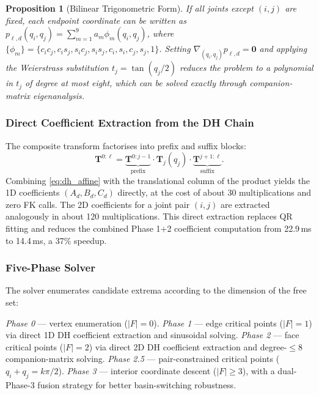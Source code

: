 \documentclass[journal]{IEEEtran}
\newtheorem{proposition}{Proposition}
\begin{document}
\begin{proposition}[Bilinear Trigonometric Form]\label{prop:bilinear}
If all joints except $(i,j)$ are fixed, each endpoint coordinate can be
written as
$p_{\ell,d}(q_i, q_j) = \sum_{m=1}^{9} a_m \phi_m(q_i, q_j)$,
where
$\{\phi_m\} = \{c_i c_j, c_i s_j, s_i c_j, s_i s_j, c_i, s_i, c_j, s_j, 1\}$.
Setting $\nabla_{(q_i,q_j)} p_{\ell,d} = \bm{0}$ and applying the
Weierstrass substitution $t_j = \tan(q_j/2)$ reduces the problem to a
polynomial in $t_j$ of degree at most eight, which can be solved
exactly through companion-matrix eigenanalysis.
\end{proposition}

\subsubsection{Direct Coefficient Extraction from the DH Chain}

The composite transform factorises into prefix and suffix blocks:
\begin{equation}\label{eq:prefix_suffix}
  \bm{T}^{0:\ell} = \underbrace{\bm{T}^{0:j-1}}_{\text{prefix}}
  \cdot \bm{T}_j(q_j) \cdot
  \underbrace{\bm{T}^{j+1:\ell}}_{\text{suffix}}.
\end{equation}
Combining \eqref{eq:dh_affine} with the translational column of the
product yields the 1D coefficients $(A_d, B_d, C_d)$ directly, at the
cost of about 30 multiplications and zero FK calls. The 2D coefficients
for a joint pair $(i,j)$ are extracted analogously in about 120
multiplications. This direct extraction replaces QR fitting and reduces
the combined Phase 1+2 coefficient computation from 22.9\,ms to
14.4\,ms, a 37\% speedup.

\subsubsection{Five-Phase Solver}

The solver enumerates candidate extrema according to the dimension of
the free set:

\emph{Phase 0} --- vertex enumeration ($|F| = 0$).
\emph{Phase 1} --- edge critical points ($|F| = 1$) via direct 1D DH
coefficient extraction and sinusoidal solving.
\emph{Phase 2} --- face critical points ($|F| = 2$) via direct 2D DH
coefficient extraction and degree-$\leq 8$ companion-matrix solving.
\emph{Phase 2.5} --- pair-constrained critical points
($q_i + q_j = k\pi/2$).
\emph{Phase 3} --- interior coordinate descent ($|F| \geq 3$), with a
dual-Phase-3 fusion strategy for better basin-switching robustness.
\end{document}
